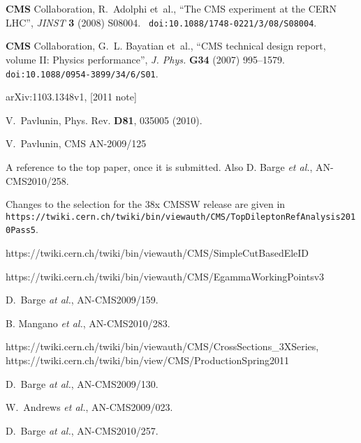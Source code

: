 \providecommand{\href}[2]{#2}\begingroup\raggedright\begin{thebibliography}{10}


{\bf CMS} Collaboration, R.~Adolphi {et~al.}, ``{The CMS experiment at the CERN
  LHC}'', {\em JINST} {\bf 3} (2008)
S08004.
  \href{http://dx.doi.org/10.1088/1748-0221/3/08/S08004}{{\tt
  doi:10.1088/1748-0221/3/08/S08004}}.

{\bf CMS} Collaboration, G.~L. Bayatian {et~al.}, ``{CMS technical design
  report, volume II: Physics performance}'', {\em J. Phys.} {\bf G34} (2007)
995--1579.
  \href{http://dx.doi.org/10.1088/0954-3899/34/6/S01}{{\tt
  doi:10.1088/0954-3899/34/6/S01}}.

 arXiv:1103.1348v1, [2011 note]

 V.~Pavlunin, Phys. Rev. {\bf D81}, 035005 (2010).
    
 V.~Pavlunin, CMS AN-2009/125

 A reference to the top paper, once it is submitted.  Also
D. Barge {\em et al.}, AN-CMS2010/258.  

 Changes to the selection for the 38x CMSSW release are given in 
{\tt https://twiki.cern.ch/twiki/bin/viewauth/CMS/TopDileptonRefAnalysis2010Pass5}.

 https://twiki.cern.ch/twiki/bin/viewauth/CMS/SimpleCutBasedEleID

 https://twiki.cern.ch/twiki/bin/viewauth/CMS/EgammaWorkingPointsv3

 D.~Barge {\em at al.}, AN-CMS2009/159.

 B. Mangano {\em et al.}, %
AN-CMS2010/283.

 https://twiki.cern.ch/twiki/bin/viewauth/CMS/CrossSections\_3XSeries, 
https://twiki.cern.ch/twiki/bin/view/CMS/ProductionSpring2011


 D.~Barge {\em at al.}, AN-CMS2009/130.

 W.~Andrews {\em et al.}, AN-CMS2009/023.

 D.~Barge {\em at al.}, AN-CMS2010/257.

\end{thebibliography}
